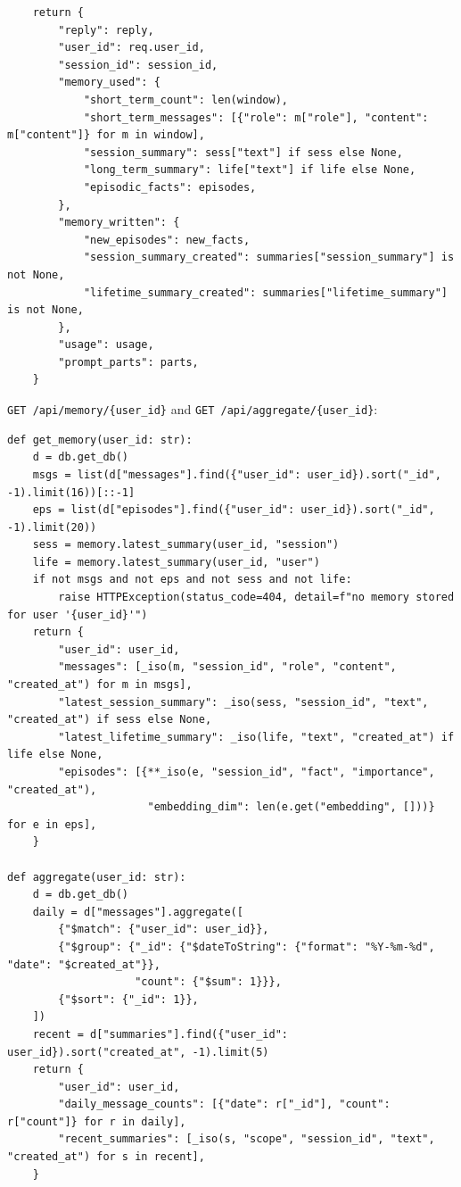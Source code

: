 \documentclass[11pt]{article}
\begin{document}
\begin{lstlisting}
    return {
        "reply": reply,
        "user_id": req.user_id,
        "session_id": session_id,
        "memory_used": {
            "short_term_count": len(window),
            "short_term_messages": [{"role": m["role"], "content": m["content"]} for m in window],
            "session_summary": sess["text"] if sess else None,
            "long_term_summary": life["text"] if life else None,
            "episodic_facts": episodes,
        },
        "memory_written": {
            "new_episodes": new_facts,
            "session_summary_created": summaries["session_summary"] is not None,
            "lifetime_summary_created": summaries["lifetime_summary"] is not None,
        },
        "usage": usage,
        "prompt_parts": parts,
    }
\end{lstlisting}
\endgroup
\texttt{GET /api/memory/\{user\_id\}} and \texttt{GET /api/aggregate/\{user\_id\}}:

\begingroup\lstset{basicstyle=\ttfamily\scriptsize}
\begin{lstlisting}
def get_memory(user_id: str):
    d = db.get_db()
    msgs = list(d["messages"].find({"user_id": user_id}).sort("_id", -1).limit(16))[::-1]
    eps = list(d["episodes"].find({"user_id": user_id}).sort("_id", -1).limit(20))
    sess = memory.latest_summary(user_id, "session")
    life = memory.latest_summary(user_id, "user")
    if not msgs and not eps and not sess and not life:
        raise HTTPException(status_code=404, detail=f"no memory stored for user '{user_id}'")
    return {
        "user_id": user_id,
        "messages": [_iso(m, "session_id", "role", "content", "created_at") for m in msgs],
        "latest_session_summary": _iso(sess, "session_id", "text", "created_at") if sess else None,
        "latest_lifetime_summary": _iso(life, "text", "created_at") if life else None,
        "episodes": [{**_iso(e, "session_id", "fact", "importance", "created_at"),
                      "embedding_dim": len(e.get("embedding", []))} for e in eps],
    }

def aggregate(user_id: str):
    d = db.get_db()
    daily = d["messages"].aggregate([
        {"$match": {"user_id": user_id}},
        {"$group": {"_id": {"$dateToString": {"format": "%Y-%m-%d", "date": "$created_at"}},
                    "count": {"$sum": 1}}},
        {"$sort": {"_id": 1}},
    ])
    recent = d["summaries"].find({"user_id": user_id}).sort("created_at", -1).limit(5)
    return {
        "user_id": user_id,
        "daily_message_counts": [{"date": r["_id"], "count": r["count"]} for r in daily],
        "recent_summaries": [_iso(s, "scope", "session_id", "text", "created_at") for s in recent],
    }
\end{lstlisting}
\endgroup
\end{document}
